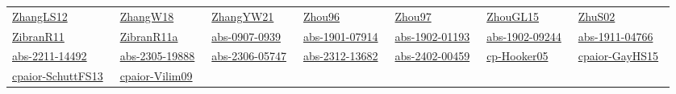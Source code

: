 {\begin{longtable}{*{7}{l}}
\href{papers/ZhangLS12.pdf}{ZhangLS12}~\cite{ZhangLS12} & \href{articles/ZhangW18.pdf}{ZhangW18}~\cite{ZhangW18} & \href{articles/ZhangYW21.pdf}{ZhangYW21}~\cite{ZhangYW21} & \href{papers/Zhou96.pdf}{Zhou96}~\cite{Zhou96} & \href{articles/Zhou97.pdf}{Zhou97}~\cite{Zhou97} & \href{papers/ZhouGL15.pdf}{ZhouGL15}~\cite{ZhouGL15} & \href{papers/ZhuS02.pdf}{ZhuS02}~\cite{ZhuS02}\\ 
\href{papers/ZibranR11.pdf}{ZibranR11}~\cite{ZibranR11} & \href{papers/ZibranR11a.pdf}{ZibranR11a}~\cite{ZibranR11a} & \href{articles/abs-0907-0939.pdf}{abs-0907-0939}~\cite{abs-0907-0939} & \href{articles/abs-1901-07914.pdf}{abs-1901-07914}~\cite{abs-1901-07914} & \href{articles/abs-1902-01193.pdf}{abs-1902-01193}~\cite{abs-1902-01193} & \href{articles/abs-1902-09244.pdf}{abs-1902-09244}~\cite{abs-1902-09244} & \href{articles/abs-1911-04766.pdf}{abs-1911-04766}~\cite{abs-1911-04766}\\ 
\href{articles/abs-2211-14492.pdf}{abs-2211-14492}~\cite{abs-2211-14492} & \href{articles/abs-2305-19888.pdf}{abs-2305-19888}~\cite{abs-2305-19888} & \href{articles/abs-2306-05747.pdf}{abs-2306-05747}~\cite{abs-2306-05747} & \href{articles/abs-2312-13682.pdf}{abs-2312-13682}~\cite{abs-2312-13682} & \href{articles/abs-2402-00459.pdf}{abs-2402-00459}~\cite{abs-2402-00459} & \href{papers/cp-Hooker05.pdf}{cp-Hooker05}~\cite{cp-Hooker05} & \href{papers/cpaior-GayHS15.pdf}{cpaior-GayHS15}~\cite{cpaior-GayHS15}\\ 
\href{papers/cpaior-SchuttFS13.pdf}{cpaior-SchuttFS13}~\cite{cpaior-SchuttFS13} & \href{papers/cpaior-Vilim09.pdf}{cpaior-Vilim09}~\cite{cpaior-Vilim09} & \end{longtable}
}

